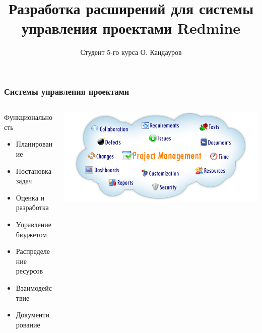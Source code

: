\documentclass[unicode]{beamer}
\title[Разработка расширений для системы управления проектами Redmine]{
Разработка расширений для системы управления проектами Redmine
}
\author[Кандауров О.\,В.]{Студент 5-го курса О. Кандауров}
\institute{
Научный руководитель: ст. преподаватель Парамонов~И.\,В.
}
\date{}
\begin{document}
\maketitle

\begin{frame}
\transwipe[direction=90]
\frametitle{Системы управления проектами}
\begin{columns}
\begin{column}{0.45\textwidth}
\begin{block}{Функциональность}
\begin{itemize}
  \item Планирование
  \item Постановка задач
  \item Оценка и разработка
  \item Управление бюджетом
  \item Распределение ресурсов
  \item Взаимодействие
  \item Документирование
\end{itemize}
\end{block}
\end{column}
\begin{column}{0.55\textwidth}
\centerline{\includegraphics[width=1\textwidth]{project-management-software.png}}
\end{column}
\end{columns}
\end{frame}
\end{document}
